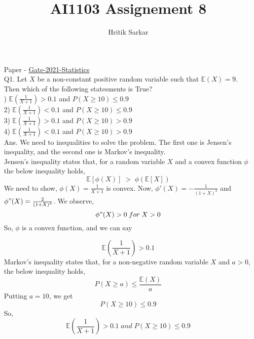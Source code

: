 \documentclass{article}
\title{AI1103 Assignement 8}
\author{Hritik Sarkar}
\theoremstyle{remark}
\begin{document}
\maketitle
Paper - \href{https://gate.iitkgp.ac.in/old_question_papers.html}{Gate-2021-Statistics}\\
Q1. Let $X$ be a non-constant positive random variable such that $\mathbb{E}(X)=9$. Then which of the following statesments is True?\\
) $\mathbb{E}(\frac{1}{X+1})>0.1$ and $P(X\ge10)\le0.9$\\
2) $\mathbb{E}(\frac{1}{X+1})<0.1$ and $P(X\ge10)\le0.9$\\
3) $\mathbb{E}(\frac{1}{X+1})>0.1$ and $P(X\ge10)>0.9$\\
4) $\mathbb{E}(\frac{1}{X+1})<0.1$ and $P(X\ge10)>0.9$\\
\newline
Ans.    We need to inequalities to solve the problem. The first one is Jensen's inequality, and the second one is Markov's inequality.\\
Jensen's inequality states that, for a random variable $X$ and a convex function $\phi$ the below inequality holds,
\[
    \mathbb{E}[\phi(X)]\; > \; \phi(\mathbb{E}[X])
\]
We need to show, $\phi(X)=\frac{1}{X+1}$ is convex. Now, $\phi'(X)=-\frac{1}{(1+X)^2}$ and $\phi"(X)=\frac{2}{(1+X)^3}$. We observe, 
\[
    \phi"(X) > 0\; for \; X>0 
\]
So, $\phi$ is a convex function, and we can say

\[
    \mathbb{E}(\frac{1}{X+1})>0.1
\]
Markov's inequality states that, for a non-negative random variable $X$ and $a>0$, the below inequality holds,
\[P(X\ge a) \le \frac{\mathbb{E}(X)}{a}\]
Putting $a=10$, we get
\[
    P(X\ge10)\le0.9
\]
So,
\[
    \mathbb{E}(\frac{1}{X+1})>0.1\; and \; P(X\ge10)\le0.9
\]
\end{document}
